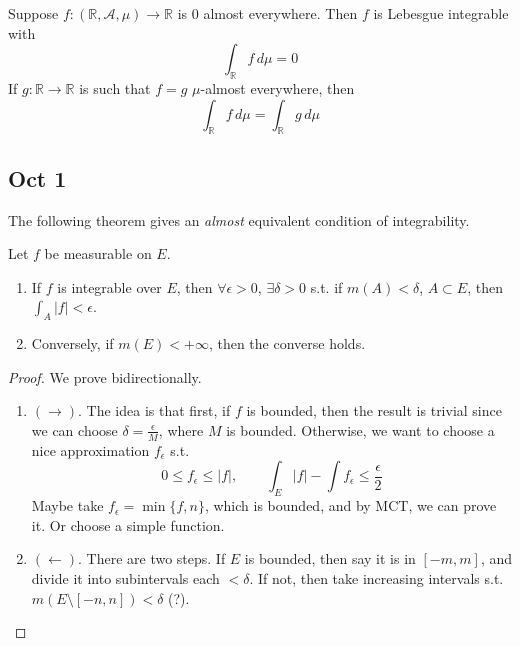   \begin{theorem}
    Suppose $f: (\mathbb{R}, \mathcal{A}, \mu) \longrightarrow \mathbb{R}$ is $0$ almost everywhere. Then $f$ is Lebesgue integrable with 
    \begin{equation}
      \int_\mathbb{R} f \, d\mu = 0 
    \end{equation}
    If $g: \mathbb{R} \longrightarrow \mathbb{R}$ is such that $f = g$ $\mu$-almost everywhere, then
    \begin{equation}
      \int_\mathbb{R} f\, d\mu = \int_\mathbb{R} g \, d\mu
    \end{equation}
  \end{theorem}

\subsection{Oct 1} 

  The following theorem gives an \textit{almost} equivalent condition of integrability. 

  \begin{theorem}
    Let $f$ be measurable on $E$. 
    \begin{enumerate}
      \item If $f$ is integrable over $E$, then $\forall \epsilon > 0$, $\exists \delta > 0$ s.t. if $m(A) < \delta$, $A \subset E$, then $\int_A |f| < \epsilon$. 
      \item Conversely, if $m(E) < +\infty$, then the converse holds. 
    \end{enumerate}
  \end{theorem}
  \begin{proof}
    We prove bidirectionally. 
    \begin{enumerate}
      \item $(\rightarrow)$. The idea is that first, if $f$ is bounded, then the result is trivial since we can choose $\delta = \frac{\epsilon}{M}$, where $M$ is bounded. Otherwise, we want to choose a nice approximation $f_\epsilon$ s.t. 
      \begin{equation}
        0 \leq f_\epsilon \leq |f|, \qquad \int_E |f| - \int f_\epsilon \leq \frac{\epsilon}{2}
      \end{equation}
      Maybe take $f_\epsilon = \min\{f, n\}$, which is bounded, and by MCT, we can prove it. Or choose a simple function.  

      \item $(\leftarrow)$. There are two steps. If $E$ is bounded, then say it is in $[-m, m]$, and divide it into subintervals each $< \delta$. If not, then take increasing intervals s.t. $m(E \setminus [-n, n]) < \delta$ (?). 
    \end{enumerate}
  \end{proof}

